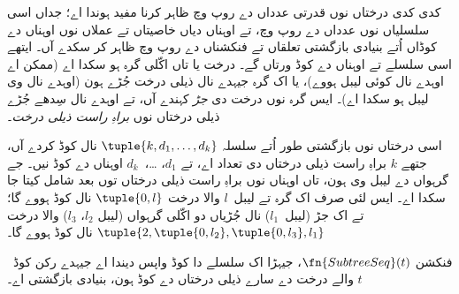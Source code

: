 \documentclass[../../../include/open-logic-section]{subfiles}
\begin{document}

کدی کدی درختاں نوں قدرتی عدداں دے روپ وچ ظاہر کرنا
مفید ہوندا اے؛ جداں اسی سلسلیاں نوں عدداں دے روپ وچ،
تے اوہناں دیاں خاصیتاں تے عملاں نوں اوہناں دے کوڈاں
اُتے بنیادی بازگشتی تعلقاں تے فنکشناں دے روپ وچ ظاہر
کر سکدے آں۔ ایتھے اسی سلسلے تے اوہناں دے کوڈ ورتاں گے۔
درخت یا تاں اکّلی گرہ ہو سکدا اے (ممکن اے اوہدے
نال کوئی لیبل ہووے)، یا اک گرہ جیہدے نال ذیلی درخت
جُڑے ہون (اوہدے نال وی لیبل ہو سکدا اے)۔
ایس گرہ نوں درخت دی \emph{جڑ} کہندے آں، تے اوہدے نال
سِدھے جُڑے ذیلی درختاں نوں \emph{براہِ راست ذیلی درخت}۔

اسی درختاں نوں بازگشتی طور اُتے سلسلہ
$\tuple{k, d_1, \dots, d_k}$ نال کوڈ کردے آں،
جتھے $k$ براہِ راست ذیلی درختاں دی تعداد اے،
تے $d_1$، \dots،~$d_k$ اوہناں دے کوڈ نیں۔
جے گرہواں دے لیبل وی ہون، تاں اوہناں نوں براہِ راست
ذیلی درختاں توں بعد شامل کیتا جا سکدا اے۔ ایس لئی
صرف اک گرہ تے لیبل~$l$ والا درخت
$\tuple{0,l}$ نال کوڈ ہووے گا؛ تے اک جڑ (لیبل~$l_1$)
نال جُڑیاں دو اکّلی گرہواں (لیبل $l_2$، $l_3$)
والا درخت $\tuple{2,
  \tuple{0, l_2}, \tuple{0, l_3}, l_1}$ نال کوڈ ہووے گا۔

\begin{prop}
فنکشن $\fn{SubtreeSeq}(t)$، جیہڑا اک سلسلے دا کوڈ
واپس دیندا اے جیہدے رکن کوڈ~$t$ والے درخت دے سارے
ذیلی درختاں دے کوڈ ہون، بنیادی بازگشتی اے۔
\end{prop}
\end{document}
